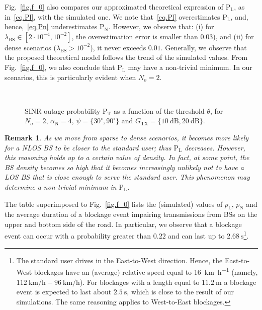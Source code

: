 \documentclass[10pt,journal,a4paper]{IEEEtran}
\newtheorem{remark}{Remark}[section]
\begin{document}
Fig.~\ref{fig.f_0} also compares our approximated theoretical expression of  $\mathrm{P}_\mathrm{L}$, as in~\eqref{eq.Pl}, with the simulated one. We note that~\eqref{eq.Pl} overestimates $\mathrm{P}_\mathrm{L}$, and, hence,~\eqref{eq.Pn} underestimates $\mathrm{P}_\mathrm{N}$. However, we observe that: (i) for $\lambda_{\mathrm{BS}} \in [ 2 \cdot 10^{-4}, 10^{-2} ]$, the overestimation error is smaller than $0.03$), and (ii) for dense scenarios ($\lambda_{\mathrm{BS}} > 10^{-2}$), it never exceeds $0.01$. Generally, we observe that the proposed theoretical model follows the trend of the simulated values.
From Fig.~\ref{fig.f_0}, we also conclude that $\mathrm{P}_\mathrm{L}$ may have a non-trivial minimum. In our scenarios, this is particularly evident when $N_o = 2$.

\begin{figure}[tb]
\centering
{}\\
\caption{SINR outage probability $\mathrm{P}_{\mathrm{T}}$ as a function of the threshold $\theta$, for $N_o = 2$, $\alpha_\mathrm{N} = 4$, $\psi = \{30^\circ, 90^\circ\}$ and $G_{\mathrm{TX}} = \{\SI{10}{\dB}, \SI{20}{\dB}\}$.}
\label{fig.f_2}
\end{figure}

\begin{remark}
As we move from sparse to dense scenarios, it becomes more likely for a NLOS BS to be closer to the standard user; thus $\mathrm{P}_\mathrm{L}$ decreases. However, this reasoning holds up to a certain value of density. In fact, at some point, the BS density becomes so high that it becomes increasingly unlikely not to have a LOS BS that is close enough to serve the standard user. This phenomenon may determine a non-trivial minimum in $\mathrm{P}_\mathrm{L}$.
\end{remark}

{The table superimposed to Fig.~\ref{fig.f_0} lists the (simulated) values of $p_\mathrm{L}$, $p_\mathrm{N}$ and the average duration of a blockage event impairing transmissions from BSs on the upper and bottom side of the road. In particular, we observe that a blockage event can occur with a probability greater than $0.22$ and can last up to $\SI{2.68}{\second}$\footnote{{The standard user drives in the East-to-West direction. Hence, the East-to-West blockages have an (average) relative speed equal to \SI{16}{\kilo\meter\per\hour} (namely, $\SI{112}{\kilo\meter\per\hour} - \SI{96}{\kilo\meter\per\hour}$). For blockages with a length equal to $\SI{11.2}{\meter}$ a blockage event is expected to last about $\SI{2.5}{\second}$, which is close to the result of our simulations. The same reasoning applies to West-to-East blockages.}}.}
\end{document}
